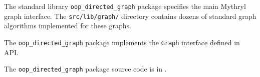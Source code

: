 
The standard library {\tt oop\_directed\_graph} package specifies the main Mythryl graph interface. 
The {\tt src/lib/graph/} directory contains dozens of standard graph algorithms implemented 
for these graphs.

The {\tt oop\_directed\_graph} package implements the {\tt Graph} interface defined in  API.

The {\tt oop\_directed\_graph} package source code is in .



